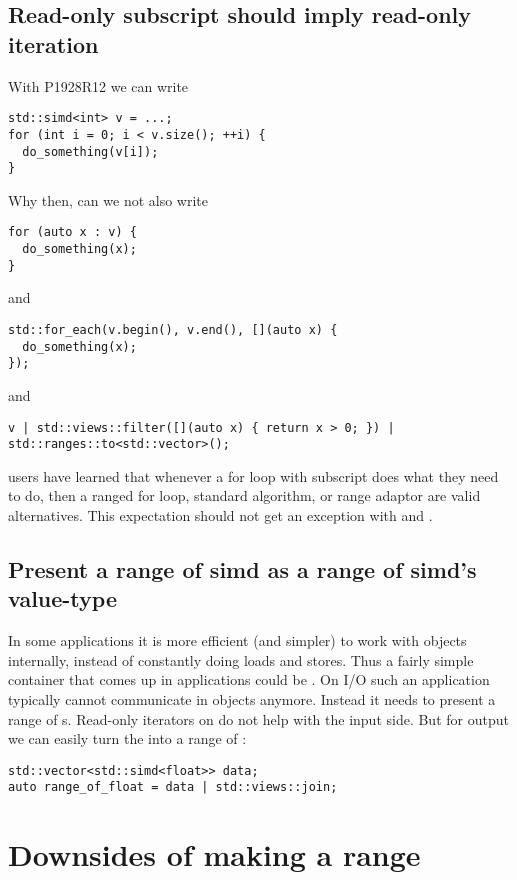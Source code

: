 \subsection{Read-only subscript should imply read-only iteration}

With P1928R12 we can write
\medskip\begin{lstlisting}
std::simd<int> v = ...;
for (int i = 0; i < v.size(); ++i) {
  do_something(v[i]);
}
\end{lstlisting}

Why then, can we not also write
\medskip\begin{lstlisting}
for (auto x : v) {
  do_something(x);
}
\end{lstlisting}
and
\medskip\begin{lstlisting}
std::for_each(v.begin(), v.end(), [](auto x) {
  do_something(x);
});
\end{lstlisting}
and
\medskip\begin{lstlisting}
v | std::views::filter([](auto x) { return x > 0; }) | std::ranges::to<std::vector>();
\end{lstlisting}

\CC{} users have learned that whenever a for loop with subscript does what they need to do, then a
ranged for loop, standard algorithm, or range adaptor are valid alternatives.
This expectation should not get an exception with \simd and \mask.

\subsection{Present a range of simd as a range of simd's value-type}

In some applications it is more efficient (and simpler) to work with \simd objects internally,
instead of constantly doing loads and stores.
Thus a fairly simple container that comes up in applications could be
.
On I/O such an application typically cannot communicate in \simd objects anymore.
Instead it needs to present a range of s.
Read-only iterators on \simd do not help with the input side.
But for output we can easily turn the  into a range of :
\medskip\begin{lstlisting}
std::vector<std::simd<float>> data;
auto range_of_float = data | std::views::join;
\end{lstlisting}

\section{Downsides of making  a range}

